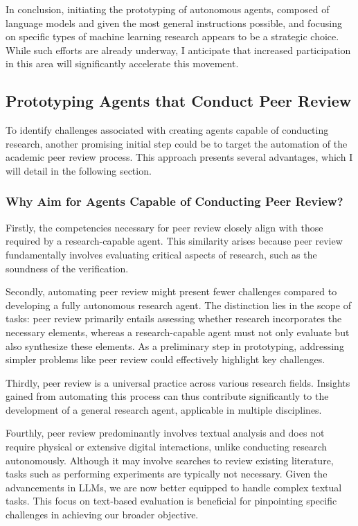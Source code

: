 \documentclass{article}
\begin{document}
In conclusion, initiating the prototyping of autonomous agents, composed of language models and given the most general instructions possible, and focusing on specific types of machine learning research appears to be a strategic choice. While such efforts are already underway, I anticipate that increased participation in this area will significantly accelerate this movement.

\subsection{Prototyping Agents that Conduct Peer Review}
To identify challenges associated with creating agents capable of conducting research, another promising initial step could be to target the automation of the academic peer review process. This approach presents several advantages, which I will detail in the following section.

\subsubsection{Why Aim for Agents Capable of Conducting Peer Review?}

Firstly, the competencies necessary for peer review closely align with those required by a research-capable agent. This similarity arises because peer review fundamentally involves evaluating critical aspects of research, such as the soundness of the verification.

Secondly, automating peer review might present fewer challenges compared to developing a fully autonomous research agent. The distinction lies in the scope of tasks: peer review primarily entails assessing whether research incorporates the necessary elements, whereas a research-capable agent must not only evaluate but also synthesize these elements. As a preliminary step in prototyping, addressing simpler problems like peer review could effectively highlight key challenges.

Thirdly, peer review is a universal practice across various research fields. Insights gained from automating this process can thus contribute significantly to the development of a general research agent, applicable in multiple disciplines.

Fourthly, peer review predominantly involves textual analysis and does not require physical or extensive digital interactions, unlike conducting research autonomously. Although it may involve searches to review existing literature, tasks such as performing experiments are typically not necessary. Given the advancements in LLMs, we are now better equipped to handle complex textual tasks. This focus on text-based evaluation is beneficial for pinpointing specific challenges in achieving our broader objective.
\end{document}
